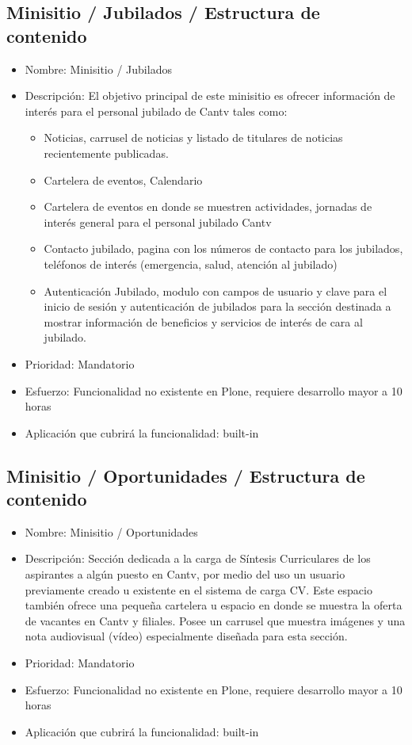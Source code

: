 \documentclass[11pt, letterpaper, oneside, spanish]{scrbook}
\begin{document}
\subsection{Minisitio / Jubilados / Estructura de contenido}
\label{sec-2-1-31}

\begin{itemize}
\item Nombre: Minisitio / Jubilados
\item Descripción: El objetivo principal de este minisitio es ofrecer información
  de interés para el personal jubilado de Cantv tales como:
\begin{itemize}
\item Noticias, carrusel de noticias y listado de titulares de noticias
    recientemente publicadas.
\item Cartelera de eventos, Calendario
\item Cartelera de eventos en donde se muestren actividades, jornadas de interés
    general para el personal jubilado Cantv
\item Contacto jubilado, pagina con los números de contacto para los jubilados,
    teléfonos de interés (emergencia, salud, atención al jubilado)
\item Autenticación Jubilado, modulo con campos de usuario y clave para el
    inicio de sesión y autenticación de jubilados para la sección destinada a
    mostrar información de beneficios y servicios de interés de cara al
    jubilado.
\end{itemize}
\item Prioridad: Mandatorio
\item Esfuerzo: Funcionalidad no existente en Plone, requiere desarrollo mayor a 10 horas
\item Aplicación que cubrirá la funcionalidad:  built-in
\end{itemize}
\subsection{Minisitio / Oportunidades / Estructura de contenido}
\label{sec-2-1-32}

\begin{itemize}
\item Nombre: Minisitio / Oportunidades
\item Descripción: Sección dedicada a la carga de Síntesis Curriculares de los
  aspirantes a algún puesto en Cantv, por medio del uso un usuario previamente
  creado u existente en el sistema de carga CV.  Este espacio también ofrece
  una pequeña cartelera u espacio en donde se muestra la oferta de vacantes en
  Cantv y filiales.  Posee un carrusel que muestra imágenes y una nota
  audiovisual (vídeo) especialmente diseñada para esta sección.
\item Prioridad: Mandatorio
\item Esfuerzo: Funcionalidad no existente en Plone, requiere desarrollo mayor a 10 horas
\item Aplicación que cubrirá la funcionalidad:  built-in
\end{itemize}
\end{document}
